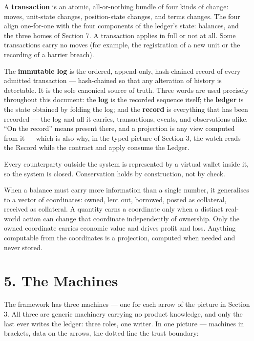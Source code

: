 \documentclass[11pt,a4paper]{article}
\begin{document}
A \textbf{transaction} is an atomic, all-or-nothing bundle of four kinds
of change: moves, unit-state changes, position-state changes, and terms
changes. The four align one-for-one with the four components of the
ledger's state: balances, and the three homes of Section 7. A
transaction applies in full or not at all. Some transactions carry no
moves (for example, the registration of a new unit or the recording of a
barrier breach).

The \textbf{immutable log} is the ordered, append-only, hash-chained
record of every admitted transaction --- hash-chained so that any
alteration of history is detectable. It is the sole canonical source of
truth. Three words are used precisely throughout this document: the
\textbf{log} is the recorded sequence itself; the \textbf{ledger} is the
state obtained by folding the log; and the \textbf{record} is everything
that has been recorded --- the log and all it carries, transactions,
events, and observations alike. ``On the record'' means present there,
and a projection is any view computed from it --- which is also why, in
the typed picture of Section 3, the watch reads the Record while the
contract and apply consume the Ledger.

Every counterparty outside the system is represented by a virtual wallet
inside it, so the system is closed. Conservation holds by construction,
not by check.

When a balance must carry more information than a single number, it
generalises to a vector of coordinates: owned, lent out, borrowed,
posted as collateral, received as collateral. A quantity earns a
coordinate only when a distinct real-world action can change that
coordinate independently of ownership. Only the owned coordinate carries
economic value and drives profit and loss. Anything computable from the
coordinates is a projection, computed when needed and never stored.

\hypertarget{the-machines}{%
\section{5. The Machines}\label{the-machines}}

The framework has three machines --- one for each arrow of the picture
in Section 3. All three are generic machinery carrying no product
knowledge, and only the last ever writes the ledger: three roles, one
writer. In one picture --- machines in brackets, data on the arrows, the
dotted line the trust boundary:
\end{document}
